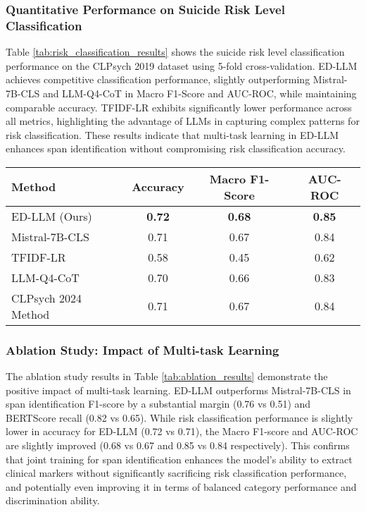 \subsubsection{Quantitative Performance on Suicide Risk Level Classification}

Table \ref{tab:risk_classification_results} shows the suicide risk level classification performance on the CLPsych 2019 dataset using 5-fold cross-validation. ED-LLM achieves competitive classification performance, slightly outperforming Mistral-7B-CLS and LLM-Q4-CoT in Macro F1-Score and AUC-ROC, while maintaining comparable accuracy.  TFIDF-LR exhibits significantly lower performance across all metrics, highlighting the advantage of LLMs in capturing complex patterns for risk classification.  These results indicate that multi-task learning in ED-LLM enhances span identification without compromising risk classification accuracy.

\begin{table*}[t]
    \centering
    \caption{Performance Comparison for Suicide Risk Level Classification on CLPsych 2019 Dataset (5-fold CV)}
    \label{tab:risk_classification_results}
    \begin{tabular}{lccc}
        \toprule
        \textbf{Method} & \textbf{Accuracy} & \textbf{Macro F1-Score} & \textbf{AUC-ROC} \\
        \midrule
        ED-LLM (Ours) & \textbf{0.72} & \textbf{0.68} & \textbf{0.85} \\
        Mistral-7B-CLS & 0.71 & 0.67 & 0.84 \\
        TFIDF-LR & 0.58 & 0.45 & 0.62 \\
        LLM-Q4-CoT & 0.70 & 0.66 & 0.83 \\
        CLPsych 2024 Method & 0.71 & 0.67 & 0.84 \\
        \bottomrule
    \end{tabular}
\end{table*}

\subsubsection{Ablation Study: Impact of Multi-task Learning}

The ablation study results in Table \ref{tab:ablation_results} demonstrate the positive impact of multi-task learning. ED-LLM outperforms Mistral-7B-CLS in span identification F1-score by a substantial margin (0.76 vs 0.51) and BERTScore recall (0.82 vs 0.65).  While risk classification performance is slightly lower in accuracy for ED-LLM (0.72 vs 0.71), the Macro F1-score and AUC-ROC are slightly improved (0.68 vs 0.67 and 0.85 vs 0.84 respectively). This confirms that joint training for span identification enhances the model's ability to extract clinical markers without significantly sacrificing risk classification performance, and potentially even improving it in terms of balanced category performance and discrimination ability.

